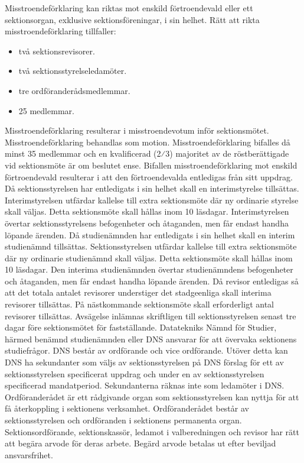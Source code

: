 \documentclass[a4paper]{dteklag}
\begin{document}
\para[Misstroendeförklaring] Misstroendeförklaring kan riktas mot enskild förtroendevald eller ett sektionsorgan, exklusive sektionsföreningar, i sin helhet.
\para Rätt att rikta misstroendeförklaring tillfaller:
\begin{itemize}
  \item två sektionsrevisorer.
  \item två sektionsstyrelseledamöter.
  \item tre ordföranderådsmedlemmar.
  \item 25 medlemmar.
\end{itemize}
\para Misstroendeförklaring resulterar i misstroendevotum inför sektionsmötet. Misstroendeförklaring behandlas som motion.
\para Misstroendeförklaring bifalles då minst 35 medlemmar och en kvalificerad (2⁄3) majoritet av de röstberättigade vid sektionsmöte är om beslutet ense.
\para Bifallen misstroendeförklaring mot enskild förtroendevald resulterar i att den förtroendevalda entledigas från sitt uppdrag.
\para Då sektionsstyrelsen har entledigats i sin helhet skall en interimstyrelse tillsättas. Interimstyrelsen utfärdar kallelse till extra sektionsmöte där ny ordinarie styrelse skall väljas. Detta sektionsmöte skall hållas inom 10 läsdagar. Interimstyrelsen övertar sektionsstyrelsens befogenheter och åtaganden, men får endast handha löpande ärenden.
\para Då studienämnden har entledigats i sin helhet skall en interim studienämnd tillsättas. Sektionsstyrelsen utfärdar kallelse till extra sektionsmöte där ny ordinarie studienämnd skall väljas. Detta sektionsmöte skall hållas inom 10 läsdagar. Den interima studienämnden övertar studienämndens befogenheter och åtaganden, men får endast handha löpande ärenden.
\para Då revisor entledigas så att det totala antalet revisorer understiger det stadgeenliga skall interima revisorer tillsättas. På nästkommande sektionsmöte skall erforderligt antal revisorer tillsättas.
\para[Avsägelse] Avsägelse inlämnas skriftligen till sektionsstyrelsen senast tre dagar före sektionsmötet för fastställande.
 Datatekniks Nämnd för Studier, härmed benämnd studienämnden eller DNS ansvarar för att övervaka sektionens studiefrågor.
\para DNS består av ordförande och vice ordförande.
\stycke Utöver detta kan DNS ha sekundanter som
väljs av sektionsstyrelsen på DNS förslag för ett av sektionsstyrelsen specificerat uppdrag och under en av sektionsstyrelsen specificerad mandatperiod.
\stycke Sekundanterna räknas inte som ledamöter i DNS.
\para[Ordföranderåd] Ordföranderådet är ett rådgivande organ som sektionsstyrelsen kan nyttja för att få återkoppling i sektionens verksamhet.
\para Ordföranderådet består av sektionsstyrelsen och ordföranden i sektionens permanenta organ.
\para[Arvode] Sektionsordförande, sektionskassör, ledamot i valberedningen och revisor har rätt att begära arvode för deras arbete.
\para Begärd arvode betalas ut efter beviljad ansvarsfrihet.
\end{document}
